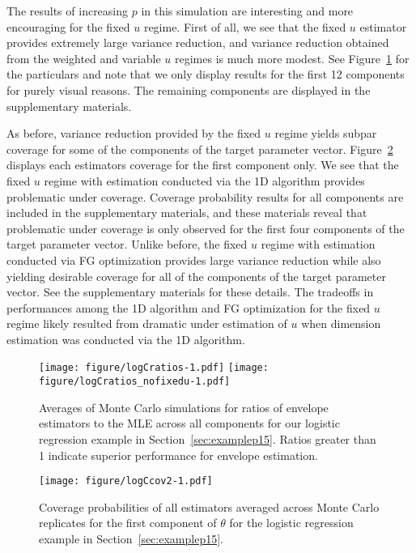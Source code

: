 \documentclass{article}\usepackage[]{graphicx}\usepackage[]{color}
\begin{document}
The results of increasing $p$ in this simulation are interesting and more encouraging for the fixed $u$ regime. First of all, we see that the fixed $u$ estimator provides extremely large variance reduction, and variance reduction obtained from the weighted and variable $u$ regimes is much more modest. See Figure~\ref{fig:logCratios} for the particulars and note that we only display results for the first 12 components for purely visual reasons. The remaining components are displayed in the supplementary materials. 

As before, variance reduction provided by the fixed $u$ regime yields subpar coverage for some of the components of the target parameter vector. Figure~\ref{fig:logCcov} displays each estimators coverage for the first component only. We see that the fixed $u$ regime with estimation conducted via the 1D algorithm provides problematic under coverage. Coverage probability results for all components are included in the supplementary materials, and these materials reveal that problematic under coverage is only observed for the first four components of the target parameter vector. Unlike before, the fixed $u$ regime with estimation conducted via FG optimization provides large variance reduction while also yielding desirable coverage for all of the components of the target parameter vector. See the supplementary materials for these details. The tradeoffs in performances among the 1D algorithm and FG optimization for the fixed $u$ regime likely resulted from dramatic under estimation of $u$ when dimension estimation was conducted via the 1D algorithm.



\begin{figure}[h!]
	\texttt{[image: figure/logCratios-1.pdf]}
\texttt{[image: figure/logCratios\_nofixedu-1.pdf]}
	\caption{Averages of Monte Carlo simulations for ratios of envelope estimators to the MLE across all components for our logistic regression example in Section~\ref{sec:examplep15}. Ratios greater than 1 indicate superior performance for envelope estimation.}
	\label{fig:logCratios}
\end{figure}

\begin{figure}[h!]
	\texttt{[image: figure/logCcov2-1.pdf]}
	\caption{Coverage probabilities of all estimators averaged across Monte Carlo replicates for the first component of $\theta$ for the logistic regression example in Section~\ref{sec:examplep15}.}
	\label{fig:logCcov}
\end{figure}
\end{document}
